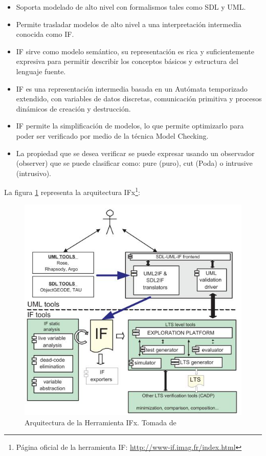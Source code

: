 \begin{itemize}
 \item Soporta modelado de alto nivel con formalismos tales como SDL y 
UML.
\item Permite trasladar modelos de alto nivel a una interpretaci\'on 
intermedia conocida como IF.
\item IF sirve como modelo sem\'antico, su representaci\'on es rica y 
suficientemente expresiva para permitir describir los conceptos b\'asicos y 
estructura del lenguaje fuente.
 \item IF es una representaci\'on intermedia basada en un Aut\'omata 
temporizado extendido, con variables de datos discretas, comunicaci\'on 
primitiva y procesos din\'amicos de creaci\'on y destrucci\'on.
\item IF permite la simplificaci\'on de modelos, lo que permite optimizarlo 
para poder ser verificado por medio de la t\'ecnica Model Checking.
\item La propiedad que se desea verificar se puede expresar usando un 
observador (observer) que se puede clasificar como: pure (puro), cut (Poda) o 
intrusive (intrusivo).
\end{itemize}

La figura \ref{fig:arquiIF} representa la arquitectura IFx\footnote{P\'agina 
oficial de la herramienta IF: \url{http://www-if.imag.fr/index.html}}:

\begin{figure}[H]
  \centering
  \includegraphics[scale=0.6]{./images/ArquitecturaIF.jpg}
  \caption{Arquitectura de la Herramienta IFx. Tomada de~\cite{Bozga2004}}
  \label{fig:arquiIF}
\end{figure}

